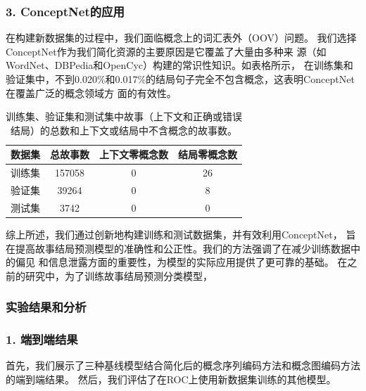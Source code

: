 \subsubsection*{3. ConceptNet的应用}
在构建新数据集的过程中，我们面临概念上的词汇表外（OOV）问题。
我们选择ConceptNet作为我们简化资源的主要原因是它覆盖了大量由多种来
源（如WordNet、DBPedia和OpenCyc）构建的常识性知识。如表格所示，
在训练集和验证集中，不到0.020\%和0.017\%的结局句子完全不包含概念，这表明ConceptNet在覆盖广泛的概念领域方
面的有效性。
\begin{table}
  \small
  \centering
  \begin{tabular}{lccc}
  \toprule
  \textbf{数据集}&总故事数&上下文零概念数&结局零概念数  \\
  \midrule
  训练集& 157058 &0&26\\
  验证集&39264&0&8\\
  测试集&3742&0&0\\
  \bottomrule
  \end{tabular}
  \caption{训练集、验证集和测试集中故事（上下文和正确或错误结局）的总数和上下文或结局中不含概念的故事数。}
  \label{tab:size2}
  \end{table}

综上所述，我们通过创新地构建训练和测试数据集，并有效利用ConceptNet，
旨在提高故事结局预测模型的准确性和公正性。我们的方法强调了在减少训练数据中的偏见
和信息泄露方面的重要性，为模型的实际应用提供了更可靠的基础。
在之前的研究中，为了训练故事结局预测分类模型，

\subsubsection{实验结果和分析}
\subsubsection*{1. 端到端结果}
\label{sec2:result}

首先，我们展示了三种基线模型结合简化后的概念序列编码方法和概念图编码方法的端到端结果。
然后，我们评估了在ROC上使用新数据集训练的其他模型。

\begin{table}
\small
\centering
{}
\caption{在ROC测试集上应用简化后的概念序列编码和概念图编码方法的端到端准确率。
原始=基线模型，简化=简化后的概念序列编码方法，概念图编码=概念图编码方法。}
\label{tab2:main}
\end{table}

